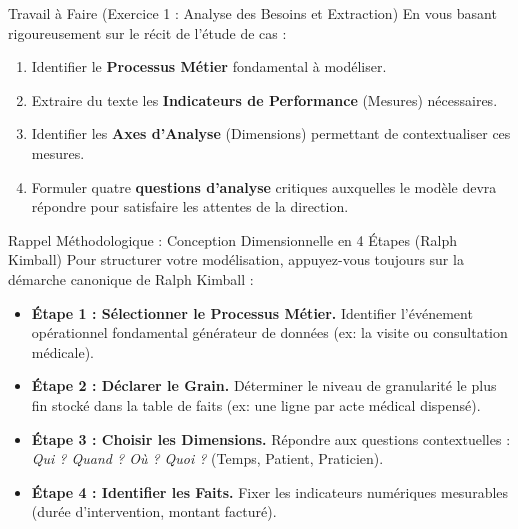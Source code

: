 \documentclass[11pt, a4paper]{article}
\begin{document}
\vspace{0.3cm}
\begin{infobox}{Travail à Faire (Exercice 1 : Analyse des Besoins et Extraction)}
En vous basant rigoureusement sur le récit de l'étude de cas :
\begin{enumerate}[label=\textbf{\arabic*.}]
    \item Identifier le \textbf{Processus Métier} fondamental à modéliser.
    \item Extraire du texte les \textbf{Indicateurs de Performance} (Mesures) nécessaires.
    \item Identifier les \textbf{Axes d'Analyse} (Dimensions) permettant de contextualiser ces mesures.
    \item Formuler quatre \textbf{questions d'analyse} critiques auxquelles le modèle devra répondre pour satisfaire les attentes de la direction.
\end{enumerate}
\end{infobox}

\vspace{0.2cm}
\begin{methodobox}{Rappel Méthodologique : Conception Dimensionnelle en 4 Étapes (Ralph Kimball)}
Pour structurer votre modélisation, appuyez-vous toujours sur la démarche canonique de Ralph Kimball :
\begin{itemize}[label=\textbullet]
    \item \textbf{Étape 1 : Sélectionner le Processus Métier.} Identifier l'événement opérationnel fondamental générateur de données (ex: la visite ou consultation médicale).
    \item \textbf{Étape 2 : Déclarer le Grain.} Déterminer le niveau de granularité le plus fin stocké dans la table de faits (ex: une ligne par acte médical dispensé).
    \item \textbf{Étape 3 : Choisir les Dimensions.} Répondre aux questions contextuelles : \textit{Qui ? Quand ? Où ? Quoi ?} (Temps, Patient, Praticien).
    \item \textbf{Étape 4 : Identifier les Faits.} Fixer les indicateurs numériques mesurables (durée d'intervention, montant facturé).
\end{itemize}
\end{methodobox}

\newpage

\end{document}
